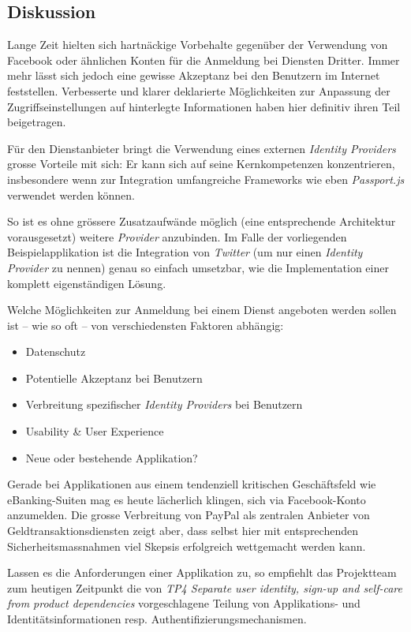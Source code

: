 \subsection*{Diskussion}

Lange Zeit hielten sich hartnäckige Vorbehalte gegenüber der Verwendung von Facebook oder ähnlichen Konten für die Anmeldung bei Diensten Dritter. Immer mehr lässt sich jedoch eine gewisse Akzeptanz bei den Benutzern im Internet feststellen. Verbesserte und klarer deklarierte Möglichkeiten zur Anpassung der Zugriffseinstellungen auf hinterlegte Informationen \cite{facebook-authdialog} haben hier definitiv ihren Teil beigetragen.

Für den Dienstanbieter bringt die Verwendung eines externen \emph{Identity Providers} grosse Vorteile mit sich: Er kann sich auf seine Kernkompetenzen konzentrieren, insbesondere wenn zur Integration umfangreiche Frameworks wie eben \emph{Passport.js} \cite{Passportjs} verwendet werden können.

So ist es ohne grössere Zusatzaufwände möglich (eine entsprechende Architektur vorausgesetzt) weitere \emph{Provider} anzubinden. Im Falle der vorliegenden Beispielapplikation ist die Integration von \emph{Twitter} (um nur einen \emph{Identity Provider} zu nennen) genau so einfach umsetzbar, wie die Implementation einer komplett eigenständigen Lösung.

Welche Möglichkeiten zur Anmeldung bei einem Dienst angeboten werden sollen ist -- wie so oft -- von verschiedensten Faktoren abhängig:

\begin{itemize}
	\item Datenschutz
	\item Potentielle Akzeptanz bei Benutzern
	\item Verbreitung spezifischer \emph{Identity Providers} bei Benutzern
	\item Usability \& User Experience
	\item Neue oder bestehende Applikation?
\end{itemize}

Gerade bei Applikationen aus einem tendenziell kritischen Geschäftsfeld wie eBanking-Suiten mag es heute lächerlich klingen, sich via Facebook-Konto anzumelden. Die grosse Verbreitung von PayPal \cite{paypal} als zentralen Anbieter von Geldtransaktionsdiensten zeigt aber, dass selbst hier mit entsprechenden Sicherheitsmassnahmen viel Skepsis erfolgreich wettgemacht werden kann.

Lassen es die Anforderungen einer Applikation zu, so empfiehlt das Projektteam zum heutigen Zeitpunkt die von \emph{TP4 Separate user identity, sign-up and self-care from product dependencies} vorgeschlagene Teilung von Applikations- und Identitätsinformationen resp. Authentifizierungsmechanismen.
